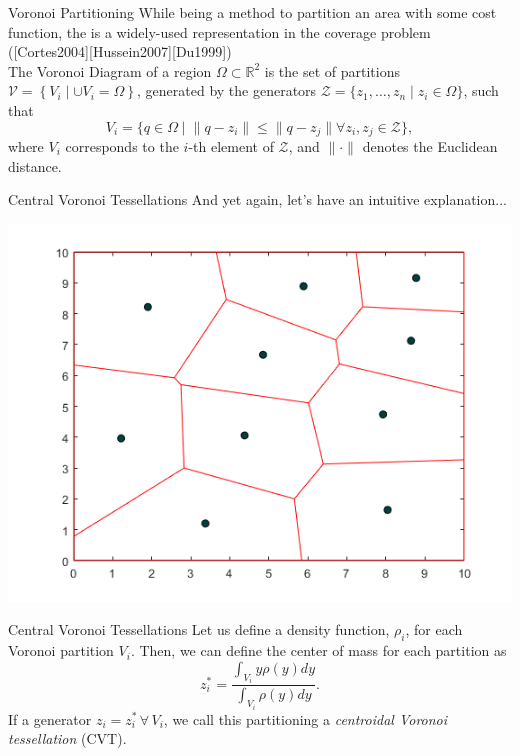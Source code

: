 \documentclass[t]{beamer}
\newcommand{\rsqr}{\mathbb{R}^2}
\begin{document}
\begin{frame}[label=vorpart2]{Voronoi Partitioning}
While being a method to partition an area with some cost function, the is a widely-used representation in the coverage problem ([Cortes2004][Hussein2007][Du1999])
\\
The Voronoi Diagram of a region $\Omega \subset \rsqr$ is the set of partitions $\mathcal{V} = \left\{V_{i} \mid \cup V_{i} = \Omega\right\}$, generated by the generators $\mathcal{Z} = \{z_1,\ldots,z_n\mid z_{i} \in \Omega\}$, such that
\begin{equation} \label{Voronoi Definition}
V_{i} = \{q\in\Omega \mid \lVert q - z_i \rVert \leq \lVert q - z_j \rVert \forall z_i,z_j\in\mathcal{Z}\},
\end{equation}
where $V_{i}$ corresponds to the $i$-th element of $\mathcal{Z}$, and $\lVert \cdot \rVert$ denotes the Euclidean distance.
\end{frame}

\begin{frame}[label=centvorpart1]{Central Voronoi Tessellations}
And yet again, let's have an intuitive explanation...
\begin{center}
\includegraphics[scale=0.5]{central-Voronoi-example.png}
\end{center}
\end{frame}

\begin{frame}[label=centvorpart2]{Central Voronoi Tessellations}
Let us define a density function, $\rho_i$, for each Voronoi partition $V_{i}$. Then, we can define the center of mass for each partition as
\begin{equation}
z_{i}^{*} = \frac{\int_{V_{i}}y\rho(y)dy}{\int_{V_{i}}\rho(y)dy}.
\end{equation}
If a generator $z_{i} = z_{i}^{*} \, \forall \,V_{i}$, we call this partitioning a \emph{centroidal Voronoi tessellation} (CVT).
\end{frame}
\end{document}

